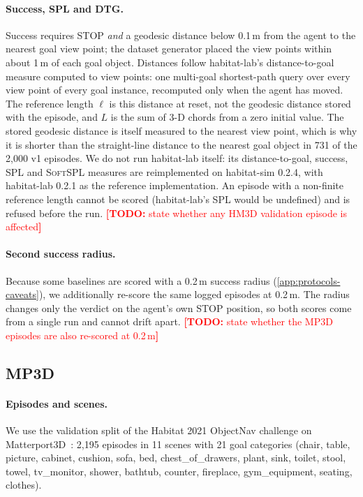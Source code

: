 \documentclass[10pt]{article}
\newcommand{\TODO}[1]{\textcolor{red}{\textbf{[TODO:} #1\textbf{]}}}
\newcommand{\SPL}{\textsc{SPL}\xspace}
\newcommand{\SoftSPL}{\textsc{SoftSPL}\xspace}
\begin{document}
\paragraph{Success, SPL and DTG.} Success requires STOP \emph{and} a geodesic distance below 0.1\,m from the agent to the nearest goal view point; the dataset generator placed the view points within about 1\,m of each goal object. Distances follow habitat-lab's distance-to-goal measure computed to view points: one multi-goal shortest-path query over every view point of every goal instance, recomputed only when the agent has moved. The reference length $\ell$ is this distance at reset, not the geodesic distance stored with the episode, and $L$ is the sum of 3-D chords from a zero initial value. The stored geodesic distance is itself measured to the nearest view point, which is why it is shorter than the straight-line distance to the nearest goal object in 731 of the 2{,}000 v1 episodes. We do not run habitat-lab itself: its distance-to-goal, success, \SPL and \SoftSPL measures are reimplemented on habitat-sim 0.2.4, with habitat-lab 0.2.1 as the reference implementation. An episode with a non-finite reference length cannot be scored (habitat-lab's \SPL would be undefined) and is refused before the run. \TODO{state whether any HM3D validation episode is affected}

\paragraph{Second success radius.} Because some baselines are scored with a 0.2\,m success radius (\cref{app:protocols-caveats}), we additionally re-score the same logged episodes at 0.2\,m. The radius changes only the verdict on the agent's own STOP position, so both scores come from a single run and cannot drift apart. \TODO{state whether the MP3D episodes are also re-scored at 0.2\,m}

\subsection{MP3D}\label{app:protocols-mp3d}

\paragraph{Episodes and scenes.} We use the validation split of the Habitat 2021 ObjectNav challenge on Matterport3D~\citep{chang2017matterport3d}: 2{,}195 episodes in 11 scenes with 21 goal categories (chair, table, picture, cabinet, cushion, sofa, bed, chest\_of\_drawers, plant, sink, toilet, stool, towel, tv\_monitor, shower, bathtub, counter, fireplace, gym\_equipment, seating, clothes).
\end{document}
